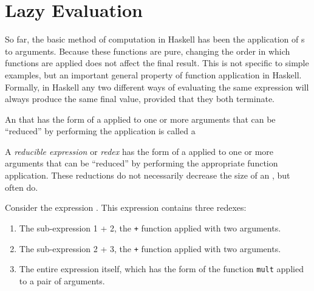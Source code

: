 \section{Lazy Evaluation}\label{sec:Lazy_Evaluation}
So far, the basic method of computation in Haskell has been the application of s to arguments.
Because these functions are pure, changing the order in which functions are applied does not affect the final result.
This is not specific to simple examples, but an important general property of function application in Haskell.
Formally, in Haskell any two different ways of evaluating the same expression will always produce the same final value, provided that they both terminate.

An  that has the form of a  applied to one or more arguments that can be ``reduced'' by performing the application is called a 

\begin{definition}\label{def:Reducible_Expression}
  A \emph{reducible expression} or \emph{redex} has the form of a  applied to one or more arguments that can be ``reduced'' by performing the appropriate function application.
  These reductions do not necessarily decrease the size of an , but often do.
\end{definition}

Consider the expression .
This expression contains three redexes:
\begin{enumerate}[noitemsep]
\item The sub-expression 1 + 2, the \texttt{+} function applied with two arguments.
\item The sub-expression 2 + 3, the \texttt{+} function applied with two arguments.
\item The entire expression itself, which has the form of the function \texttt{mult} applied to a pair of arguments.
\end{enumerate}



